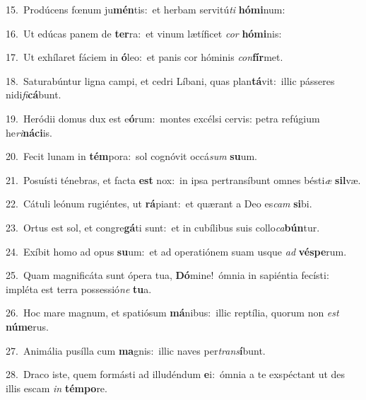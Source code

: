 {\numbfont\textcolor{\numbcolor}{15.}}~Prodúcens fœnum ju\-\textbf{mén}\-tis:~\star et herbam servitú\textit{ti} \textbf{hó}\-\textbf{mi}num:\par
{\numbfont\textcolor{\numbcolor}{16.}}~Ut edúcas panem de \textbf{ter}\-ra:~\star et vinum lætíficet \textit{cor} \textbf{hó}\-\textbf{mi}nis:\par
{\numbfont\textcolor{\numbcolor}{17.}}~Ut exhílaret fáciem in \textbf{ó}\-leo:~\star et panis cor hóminis \textit{con}\-\textbf{fír}met.\par
{\numbfont\textcolor{\numbcolor}{18.}}~Saturabúntur ligna campi, et cedri Líbani, quas plan\-\textbf{tá}\-vit:~\star illic pásseres nidi\-\textit{fi}\-\textbf{cá}bunt.\par
{\numbfont\textcolor{\numbcolor}{19.}}~Heródii domus dux est e\-\textbf{ó}\-rum:~\star montes excélsi cervis: petra refúgium he\-\textit{ri}\-\textbf{ná}\textbf{ci}is.\par
{\numbfont\textcolor{\numbcolor}{20.}}~Fecit lunam in \textbf{tém}\-pora:~\star sol cognóvit occá\textit{sum} \textbf{su}\-um.\par
{\numbfont\textcolor{\numbcolor}{21.}}~Posuísti ténebras, et facta \textbf{est} nox:~\star in ipsa pertransíbunt omnes bésti\textit{æ} \textbf{sil}\-væ.\par
{\numbfont\textcolor{\numbcolor}{22.}}~Cátuli leónum rugiéntes, ut \textbf{rá}\-piant:~\star et quærant a Deo es\textit{cam} \textbf{si}\-bi.\par
{\numbfont\textcolor{\numbcolor}{23.}}~Ortus est sol, et congre\-\textbf{gá}\-ti sunt:~\star et in cubílibus suis collo\-\textit{ca}\-\textbf{bún}tur.\par
{\numbfont\textcolor{\numbcolor}{24.}}~Exíbit homo ad opus \textbf{su}\-um:~\star et ad operatiónem suam usque \textit{ad} \textbf{vés}\-\textbf{pe}rum.\par
{\numbfont\textcolor{\numbcolor}{25.}}~Quam magnificáta sunt ópera tua, \textbf{Dó}\-mine!~\star ómnia in sapiéntia fecísti: impléta est terra possessió\textit{ne} \textbf{tu}\-a.\par
{\numbfont\textcolor{\numbcolor}{26.}}~Hoc mare magnum, et spatiósum \textbf{má}\-nibus:~\star illic reptília, quorum non \textit{est} \textbf{nú}\-\textbf{me}rus.\par
{\numbfont\textcolor{\numbcolor}{27.}}~Animália pusílla cum \textbf{ma}\-gnis:~\star illic naves per\-\textit{trans}\-\textbf{í}bunt.\par
{\numbfont\textcolor{\numbcolor}{28.}}~Draco iste, quem formásti ad illudéndum \textbf{e}\-i:~\star ómnia a te exspéctant ut des illis escam \textit{in} \textbf{tém}\-\textbf{po}re.\par
